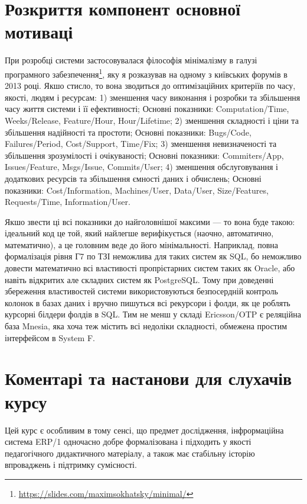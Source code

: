 \section*{Розкриття компонент основної мотиваці}

При розробці системи застосовувалася філософія мінімалізму в галузі
програмного забезпечення\footnote{\url{https://slides.com/maximsokhatsky/minimal/}},
яку я розказував на одному з київських форумів в 2013 році. Якшо стисло, то вона
зводиться до оптимізаційних критеріїв по часу, якості, людям і ресурсам:
1) зменшення часу виконання і розробки та збільшення часу життя системи і її ефективності;
Основні показники: Computation/Time, Weeks/Release, Feature/Hour, Hour/Lifetime;
2) зменшення складності і ціни та збільшення надійності та простоти;
Основні показники: Bugs/Code, Failures/Period, Cost/Support, Time/Fix;
3) зменшення невизначеності та збільшення зрозумілості і очікуваності;
Основні показники: Commiters/App, Issues/Feature, Msgs/Issue, Commits/User;
4) зменшення обслуговування і додаткових ресурсів та збільшення ємності даних і обчислень;
Основні показники: Cost/Information, Machines/User, Data/User,
Size/Features, Requests/Time, Information/User.

Якшо звести ці всі показники до найголовнішої максими — то вона буде такою:
ідеальний код це той, який найлегше верифікується (наочно, автоматично, математично),
а це головним веде до його мінімальності. Наприклад, повна формалізація рівня Г7 по ТЗІ
неможлива для таких систем як SQL, бо неможливо довести математично всі властивості
пропрієтарних систем таких як Oracle, або навіть відкритих але складних систем як PostgreSQL.
Тому при доведенні збереження властивостей системи використовуються безпосердній контроль
колонок в базах даних і вручно пишуться всі рекурсори і фолди, як це роблять
курсорні білдери фолдів в SQL. Тим не менш у складі Ericsson/OTP є реляційна база
Mnesia, яка хоча теж містить всі недоліки складності, обмежена простим інтерфейсом в System F.

\newpage
\section*{Коментарі та настанови для слухачів курсу}

Цей курс є особливим в тому сенсі, що предмет дослідження,
інфрормаційна система ERP/1 одночасно добре формалізована
і підходить у якості педагогічного дидактичного матеріалу,
а також має стабільну історію впроваджень і підтримку сумісності.

